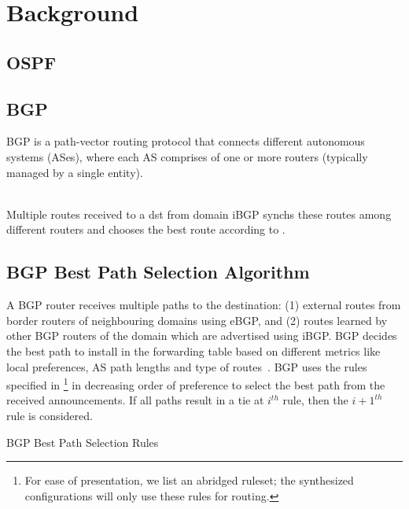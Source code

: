 \section{Background}
\subsection{OSPF}

\subsection{BGP}
BGP is a path-vector routing protocol that connects 
different autonomous systems (ASes), where each AS
comprises of one or more routers (typically managed
by a single entity). 

\\
Multiple routes received to a dst from domain
iBGP synchs these routes among different routers
and chooses the best route according to .

\subsection{BGP Best Path Selection Algorithm}
A BGP router receives multiple paths to the destination: (1)
external routes from border routers of neighbouring domains using
eBGP, and (2) routes learned by other BGP routers 
of the domain which are advertised using iBGP. 
BGP decides the best path to install in the 
forwarding table based on different metrics like local preferences,
AS path lengths and type of routes~\cite{bgp}. BGP uses the
rules specified in \footnote{
For ease of presentation, we list an abridged ruleset; 
the synthesized configurations will only use these rules 
for routing.  
} 
in decreasing order of preference to select the best path
from the received announcements. If all paths result in a tie
at $i^{th}$ rule, then the $i+1^{th}$ rule is considered.
\begin{algorithm}
	\begin{footnotesize}
		\caption{BGP Best Path Selection Rules}
		\label{alg:bgppathrules}
		\begin{algorithmic}[1]
		\end{algorithmic}
	\end{footnotesize}
\end{algorithm}

